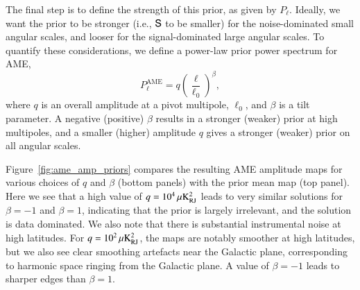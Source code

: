 \documentclass[twocolumn]{aa}
\renewcommand{\S}[0]{\tens{S}}
\begin{document}
The final step is to define the strength of this prior, as given by
$P_{\ell}$. Ideally, we want the prior to be stronger (i.e., $\S$ to
be smaller) for the noise-dominated small angular scales, and looser
for the signal-dominated large angular scales. To quantify these
considerations, we define a power-law prior power spectrum for AME,
\begin{equation}
  P_{\ell}^{\mathrm{AME}} = q\left(\frac{\ell}{\ell_0}\right)^\beta,
  \label{eq:prior_AME}
\end{equation}
where $q$ is an overall amplitude at a pivot multipole, $\ell_0$, and
$\beta$ is a tilt parameter. A negative (positive) $\beta$ results in
a stronger (weaker) prior at high multipoles, and a smaller (higher)
amplitude $q$ gives a stronger (weaker) prior on all angular
scales.

Figure~\ref{fig:ame_amp_priors} compares the resulting AME amplitude
maps for various choices of $q$ and $\beta$ (bottom panels) with the
prior mean map (top panel). Here we see that a high value of $q=10^4\muK_{\mathrm{RJ}}^2$
leads to very similar solutions for $\beta=-1$ and $\beta=1$,
indicating that the prior is largely irrelevant, and the solution is
data dominated. We also note that there is substantial instrumental
noise at high latitudes. For $q=10^2\muK_{\mathrm{RJ}}^2$, the maps are notably smoother
at high latitudes, but we also see clear smoothing artefacts near the
Galactic plane, corresponding to harmonic space ringing from the
Galactic plane. A value of $\beta=-1$ leads to sharper edges than
$\beta=1$. 
\end{document}
